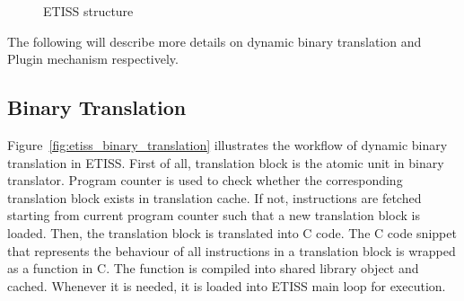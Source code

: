 \begin{figure}[htbp]
    \caption{ETISS structure}
    \label{fig:etiss_structure}
\end{figure}

The following will describe more details on dynamic binary translation and Plugin mechanism respectively.

\subsection{Binary Translation}
Figure~\ref{fig:etiss_binary_translation} illustrates the workflow of dynamic binary translation in ETISS.
First of all, translation block is the atomic unit in binary translator. Program counter is used to check whether the corresponding translation block exists in translation cache.
If not, instructions are fetched starting from current program counter such that a new translation block is loaded. Then, the translation block is translated into C code.
The C code snippet that represents the behaviour of all instructions in a translation block is wrapped as a function in C. The function is compiled into shared library object and cached.
Whenever it is needed, it is loaded into ETISS main loop for execution. 


